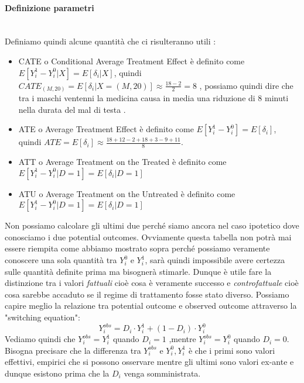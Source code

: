 \paragraph{Definizione parametri} \hspace{0pt} \\
\label{parag:param}
Definiamo quindi alcune quantità che ci risulteranno utili : 
\begin{itemize}
\item CATE o Conditional Average Treatment Effect è definito come $E[Y^{1}_i- Y^{0}_i|X] = E[\delta_i|X]$, quindi $CATE_{(M,20)}=E[\delta_i|X=(M,20)] \approx \frac{18-2}{2}=8$ , possiamo quindi dire che tra i maschi ventenni la medicina causa in media una riduzione di 8 minuti nella durata del mal di testa .
\item ATE o Average Treatment Effect è definito come  $E[Y^{1}_i- Y^{0}_i] = E[\delta_i]$, quindi $ATE= E[\delta_i] \approx \frac{18+12-2+18+3-9+11}{8}$.
\item ATT o Average Treatment on the Treated è definito come  $E[Y^{1}_i- Y^{0}_i|D=1] = E[\delta_i|D=1]$ 
\item ATU o Average Treatment on the Untreated è definito come 
$E[Y^{1}_i- Y^{0}_i|D=1] = E[\delta_i|D=1]$
\end{itemize}
 
Non possiamo calcolare gli ultimi due perché siamo ancora nel caso ipotetico dove conosciamo i due potential outcomes.
Ovviamente questa tabella non potrà mai essere riempita come abbiamo mostrato sopra perché possiamo veramente conoscere una sola quantità tra $Y^0_{i}$ e $Y^1_{i}$, sarà quindi impossibile avere certezza sulle quantità definite prima ma bisognerà stimarle. 
Dunque è utile fare la distinzione tra i valori \textit{fattuali} cioè cosa è veramente successo e \textit{controfattuale} cioè cosa sarebbe accaduto se il regime di trattamento fosse stato diverso.
Possiamo capire meglio la relazione tra potential outcome e observed outcome attraverso la  "switching equation": 
\begin{equation}
Y_i^{obs} = D_i \cdot Y^1_i + (1-D_i) \cdot Y^0_i
\label{eq:switching}
\end{equation}
Vediamo quindi che $Y_i^{obs} = Y^1_i$ quando $D_i =1$ ,mentre $Y_i^{obs} = Y^0_i$ quando $D_i = 0$. 
Bisogna precisare che la differenza tra $Y_i^{obs}$ e $Y^0_i,Y^1_i$ è che i primi sono valori effettivi, empirici che si possono osservare mentre gli ultimi sono valori ex-ante e dunque esistono prima che la $D_i$ venga somministrata.

